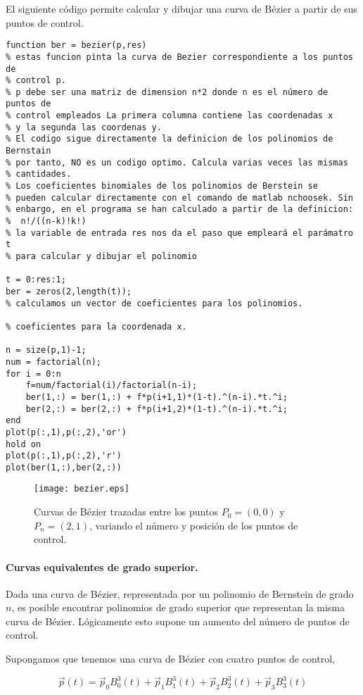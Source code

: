 El siguiente código permite calcular y dibujar una curva de Bézier a partir de sus puntos de control.
\begin{lstlisting}
function ber = bezier(p,res)
% estas funcion pinta la curva de Bezier correspondiente a los puntos de 
% control p. 
% p debe ser una matriz de dimension n*2 donde n es el número de puntos de 
% control empleados La primera columna contiene las coordenadas x 
% y la segunda las coordenas y.
% El codigo sigue directamente la definicion de los polinomios de Bernstain
% por tanto, NO es un codigo optimo. Calcula varias veces las mismas
% cantidades.
% Los coeficientes binomiales de los polinomios de Berstein se 
% pueden calcular directamente con el comando de matlab nchoosek. Sin 
% enbargo, en el programa se han calculado a partir de la definicion:
%  n!/((n-k)!k!)
% la variable de entrada res nos da el paso que empleará el parámatro t
% para calcular y dibujar el polinomio

t = 0:res:1;
ber = zeros(2,length(t));
% calculamos un vector de coeficientes para los polinomios.

% coeficientes para la coordenada x.

n = size(p,1)-1;
num = factorial(n);
for i = 0:n    
    f=num/factorial(i)/factorial(n-i);
    ber(1,:) = ber(1,:) + f*p(i+1,1)*(1-t).^(n-i).*t.^i;
    ber(2,:) = ber(2,:) + f*p(i+1,2)*(1-t).^(n-i).*t.^i;
end
plot(p(:,1),p(:,2),'or')
hold on
plot(p(:,1),p(:,2),'r')
plot(ber(1,:),ber(2,:))
\end{lstlisting}

\begin{figure}[h]
\centering
\texttt{[image: bezier.eps]} 
\caption{Curvas de Bézier trazadas entre los puntos $P_0 = (0,0)$ y $P_n = (2,1)$, variando el número y posición de los puntos de control.} 
\label{fig:bezier}
\end{figure}

\paragraph{Curvas equivalentes de grado superior.} Dada una curva de Bézier, representada por un polinomio de Bernstein de grado $n$, es posible encontrar polinomios de grado superior que representan la misma curva de Bézier. Lógicamente esto supone un aumento del número de puntos de control.

Supongamos que tenemos una curva de Bézier con cuatro puntos de control,

\begin{equation*}
\vec{p}(t) = \vec{p}_0B_0^3(t) + \vec{p}_1B_1^3(t) + \vec{p}_2B_2^3(t) + \vec{p}_3B_3^3(t)
\end{equation*}

